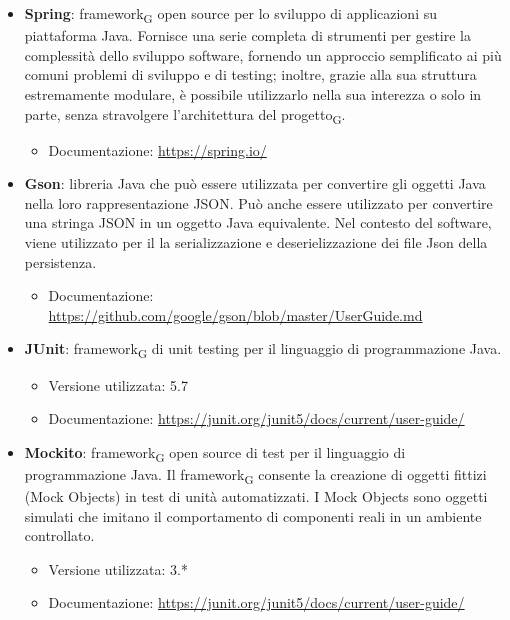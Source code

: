 \begin{itemize}
	\item \textbf{Spring}: framework\textsubscript{G} open source per lo sviluppo di applicazioni su piattaforma Java. Fornisce una serie completa di strumenti per gestire la complessità dello sviluppo software, fornendo un approccio semplificato ai più comuni problemi di sviluppo e di testing; inoltre, grazie alla sua struttura estremamente modulare, è possibile utilizzarlo nella sua interezza o solo in parte, senza stravolgere l’architettura del progetto\textsubscript{G}.
	\begin{itemize}
		\item Documentazione: \url{https://spring.io/}
	\end{itemize}
	\item \textbf{Gson}: libreria Java che può essere utilizzata per convertire gli oggetti Java nella loro rappresentazione JSON. Può anche essere utilizzato per convertire una stringa JSON in un oggetto Java equivalente. Nel contesto del software, viene utilizzato per il la serializzazione e deserielizzazione dei file Json della persistenza.
	\begin{itemize}
	\item Documentazione: \url{https://github.com/google/gson/blob/master/UserGuide.md}
	\end{itemize}
	\item \textbf{JUnit}: framework\textsubscript{G} di unit testing per il linguaggio di programmazione Java.
	\begin{itemize}
		\item Versione utilizzata: 5.7
		\item Documentazione: \url{https://junit.org/junit5/docs/current/user-guide/}
	\end{itemize}

	\item \textbf{Mockito}: framework\textsubscript{G} open source di test per il linguaggio di programmazione Java. Il framework\textsubscript{G} consente la creazione di oggetti fittizi (Mock Objects) in test di unità automatizzati. I Mock Objects sono oggetti simulati che imitano il comportamento di componenti reali in un ambiente controllato.
		\begin{itemize}
		\item Versione utilizzata: 3.*
		\item Documentazione: \url{https://junit.org/junit5/docs/current/user-guide/}
	\end{itemize}

\end{itemize}